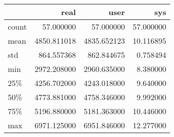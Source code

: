 \begin{tabular}{lrrr}
\toprule
{} &         real &         user &        sys \\
\midrule
count &    57.000000 &    57.000000 &  57.000000 \\
mean  &  4850.811018 &  4835.652123 &  10.116895 \\
std   &   864.557368 &   862.844675 &   0.758494 \\
min   &  2972.208000 &  2960.635000 &   8.380000 \\
25\%   &  4256.702000 &  4243.018000 &   9.640000 \\
50\%   &  4773.881000 &  4758.346000 &   9.992000 \\
75\%   &  5196.880000 &  5181.363000 &  10.446000 \\
max   &  6971.125000 &  6951.846000 &  12.277000 \\
\bottomrule
\end{tabular}
